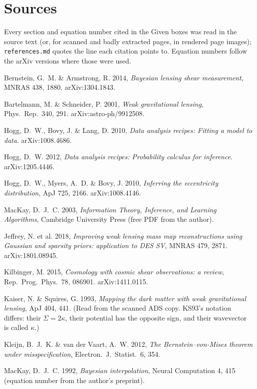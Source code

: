 \section*{Sources}
Every section and equation number cited in the Given boxes was read in the source text (or, for scanned and badly
extracted pages, in rendered page images); \texttt{references.md} quotes the line each citation points to. Equation
numbers follow the arXiv versions where those were used.
\begin{description}[itemsep=2pt,font=\normalfont\bfseries]
\item[BA14] Bernstein, G.~M. \& Armstrong, R. 2014, \emph{Bayesian lensing shear measurement}, MNRAS 438, 1880. arXiv:1304.1843.
\item[B\&S01] Bartelmann, M. \& Schneider, P. 2001, \emph{Weak gravitational lensing}, Phys.\ Rep.\ 340, 291. arXiv:astro-ph/9912508.
\item[HBL10] Hogg, D.~W., Bovy, J. \& Lang, D. 2010, \emph{Data analysis recipes: Fitting a model to data}. arXiv:1008.4686.
\item[H12] Hogg, D.~W. 2012, \emph{Data analysis recipes: Probability calculus for inference}. arXiv:1205.4446.
\item[HMB10] Hogg, D.~W., Myers, A.~D. \& Bovy, J. 2010, \emph{Inferring the eccentricity distribution}, ApJ 725, 2166. arXiv:1008.4146.
\item[ITILA03] MacKay, D.~J.~C. 2003, \emph{Information Theory, Inference, and Learning Algorithms}, Cambridge University Press (free PDF from the author).
\item[J18] Jeffrey, N. et al. 2018, \emph{Improving weak lensing mass map reconstructions using Gaussian and sparsity priors: application to DES SV}, MNRAS 479, 2871. arXiv:1801.08945.
\item[Kilbinger15] Kilbinger, M. 2015, \emph{Cosmology with cosmic shear observations: a review}, Rep.\ Prog.\ Phys.\ 78, 086901. arXiv:1411.0115.
\item[KS93] Kaiser, N. \& Squires, G. 1993, \emph{Mapping the dark matter with weak gravitational lensing}, ApJ 404, 441. (Read from the scanned ADS copy. KS93's notation differs: their $\Sigma = 2\kappa$, their potential has the opposite sign, and their wavevector is called $\kappa$.)
\item[KvdV12] Kleijn, B.~J.~K. \& van der Vaart, A.~W. 2012, \emph{The Bernstein--von-Mises theorem under misspecification}, Electron.\ J.\ Statist.\ 6, 354.
\item[M92] MacKay, D.~J.~C. 1992, \emph{Bayesian interpolation}, Neural Computation 4, 415 (equation number from the author's preprint).

\end{description}
